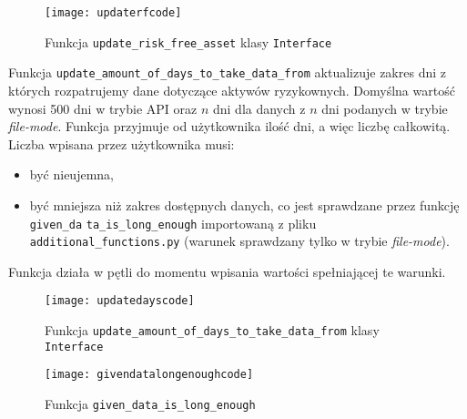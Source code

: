\documentclass[magister]{dyplom}
\def\code#1{\texttt{#1}}
\begin{document}
\begin{figure}[ht]
	\centering
	\texttt{[image: updaterfcode]}
	\caption{Funkcja \code{update\_risk\_free\_asset} klasy \code{Interface}}
\end{figure}
\newpage
Funkcja \code{update\_amount\_of\_days\_to\_take\_data\_from} aktualizuje zakres dni z których rozpatrujemy dane dotyczące aktywów ryzykownych. Domyślna wartość wynosi 500 dni w trybie API oraz $n$ dni dla danych z $n$ dni podanych w trybie \textit{file-mode}. Funkcja przyjmuje od użytkownika ilość dni, a więc liczbę całkowitą. Liczba wpisana przez użytkownika musi:
\begin{itemize}
	\item być nieujemna,
	\item być mniejsza niż zakres dostępnych danych, co jest sprawdzane przez funkcję \code{given\_da} \code{ta\_is\_long\_enough} importowaną z pliku \code{additional\_functions.py} (warunek sprawdzany tylko w trybie \textit{file-mode}).
\end{itemize}
Funkcja działa w pętli do momentu wpisania wartości spełniającej te warunki.

\begin{figure}[ht]
	\centering
	\texttt{[image: updatedayscode]}
	\caption{Funkcja \code{update\_amount\_of\_days\_to\_take\_data\_from} klasy \code{Interface}}
\end{figure}

\begin{figure}[ht]
	\centering
	\texttt{[image: givendatalongenoughcode]}
	\caption{Funkcja \code{given\_data\_is\_long\_enough}}
\end{figure}
\end{document}
